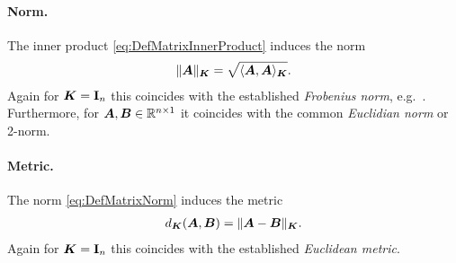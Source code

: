 \paragraph{Norm.}
The inner product \eqref{eq:DefMatrixInnerProduct} induces the norm
\begin{align}\label{eq:DefMatrixNorm}
 \norm[\mat{K}]{\mat{A}} = \sqrt{\sProd[\mat{K}]{\mat{A}}{\mat{A}}}.
\end{align}
Again for $\mat{K} = \idMat[n]$ this coincides with the established \textit{Frobenius norm}, e.g.\ \cite[p 55]{Golub:MatrixComputations}.
Furthermore, for $\mat{A}, \mat{B} \in \RealNum^{n\times 1}$ it coincides with the common \textit{Euclidian norm} or 2-norm.

\paragraph{Metric.}
The norm \eqref{eq:DefMatrixNorm} induces the metric
\begin{align}\label{eq:DefMatrixMetric}
 d_{\mat{K}}(\mat{A}, \mat{B}) = \norm[\mat{K}]{\mat{A}-\mat{B}}.
\end{align}
Again for $\mat{K} = \idMat[n]$ this coincides with the established \textit{Euclidean metric}.

